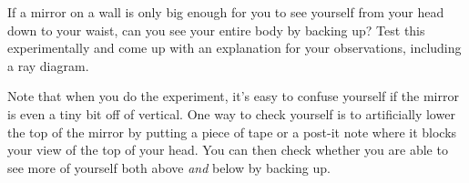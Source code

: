 If a mirror on a wall is only big enough for you to see
yourself from your head down to your waist, can you see your
entire body by backing up? Test this experimentally and
come up with an explanation for your observations,
including a ray diagram.

Note that when you do the experiment, it's easy to confuse
yourself if the mirror is even a tiny bit off of vertical.
One way to check yourself is to artificially lower the top
of the mirror by putting a piece of tape or a post-it note
where it blocks your view of the top of your head. You can
then check whether you are able to see more of yourself both
above \emph{and} below by backing up.

